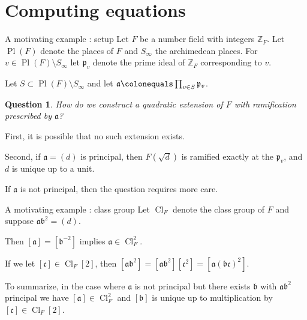 \documentclass[xcolor=dvipsnames]{beamer}
\theoremstyle{plain}
\newtheorem*{ques}{Question}
\newcommand{\ZZ}{\mathbb Z}
\DeclareMathOperator{\Pl}{Pl}
\DeclareMathOperator{\Cl}{Cl}
\begin{document}
  \section{Computing equations}{
    \begin{frame}{A motivating example : setup}
      Let $F$ be a number field with
      integers $\ZZ_F$.
      Let $\Pl(F)$ denote the places of $F$
      and $S_\infty$ the archimedean places.
      For $v\in\Pl(F)\setminus S_\infty$ let
      $\mathfrak{p}_v$ denote the prime ideal
      of $\ZZ_F$ corresponding to $v$.
      \pause\par
      Let $S\subset\Pl(F)\setminus S_\infty$ and let
      $\mathfrak{a} \colonequals\prod_{v\in S}\mathfrak{p}_v$.
      \pause\par
      \begin{ques}
        \vspace{1pt}
        How do we construct a quadratic extension of $F$
        with ramification prescribed by $\mathfrak{a}$?
      \end{ques}
      \pause
      First, it is possible that no such extension exists.
      \pause\par
      Second, if $\mathfrak{a}=(d)$ is principal,
      then $F(\sqrt{d})$ is ramified exactly at
      the $\mathfrak{p}_v$, and $d$ is unique up
      to a unit.
      \pause\par
      If $\mathfrak{a}$ is not principal,
      then the question requires more care.
    \end{frame}
    \begin{frame}{A motivating example : class group}
      Let $\Cl_F$ denote the class group of $F$
      and suppose $\mathfrak{a}\mathfrak{b}^2=(d)$.
      \pause\par
      Then
      $[\mathfrak{a}]=[\mathfrak{b}^{-2}]$
      implies $\mathfrak{a}\in\Cl_F^2$.
      \pause\par
      If we let $[\mathfrak{c}]\in\Cl_F[2]$,
      then
      $[\mathfrak{a}\mathfrak{b}^2]
        =[\mathfrak{a}\mathfrak{b}^2][\mathfrak{c}^2]
        =[\mathfrak{a}(\mathfrak{b}\mathfrak{c})^2]$.
      \pause\par
      To summarize,
      in the case where $\mathfrak{a}$ is not principal
      but there exists $\mathfrak{b}$ with
      $\mathfrak{a}\mathfrak{b}^2$ principal
      we have
      $[\mathfrak{a}]\in\Cl_F^2$
      and $[\mathfrak{b}]$ is unique
      up to multiplication by
      $[\mathfrak{c}]\in\Cl_F[2]$.
      \pause\par

\end{frame}}
\end{document}

